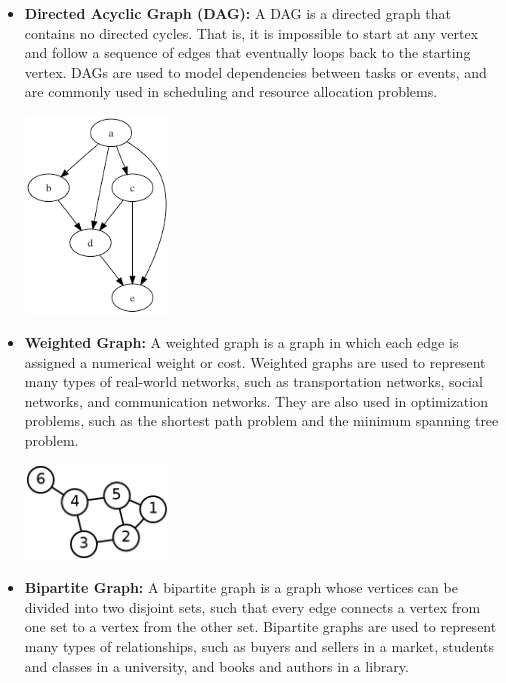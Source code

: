 \documentclass{article}
\begin{document}
\begin{itemize}
    \item \textbf{Directed Acyclic Graph (DAG):} A DAG is a directed graph that contains no directed cycles. That is, it is impossible to start at any vertex and follow a sequence of edges that eventually loops back to the starting vertex. DAGs are used to model dependencies between tasks or events, and are commonly used in scheduling and resource allocation problems.
        \begin{center}
            \includegraphics[width=0.3\textwidth]{DAG.png}
        \end{center}
    \pagebreak
    \item \textbf{Weighted Graph:} A weighted graph is a graph in which each edge is assigned a numerical weight or cost. Weighted graphs are used to represent many types of real-world networks, such as transportation networks, social networks, and communication networks. They are also used in optimization problems, such as the shortest path problem and the minimum spanning tree problem.
        \begin{center}
            \includegraphics[width=0.3\textwidth]{WG.png}
        \end{center}
    \item \textbf{Bipartite Graph:} A bipartite graph is a graph whose vertices can be divided into two disjoint sets, such that every edge connects a vertex from one set to a vertex from the other set. Bipartite graphs are used to represent many types of relationships, such as buyers and sellers in a market, students and classes in a university, and books and authors in a library.
        \begin{center}

\end{center}
\end{itemize}
\end{document}
